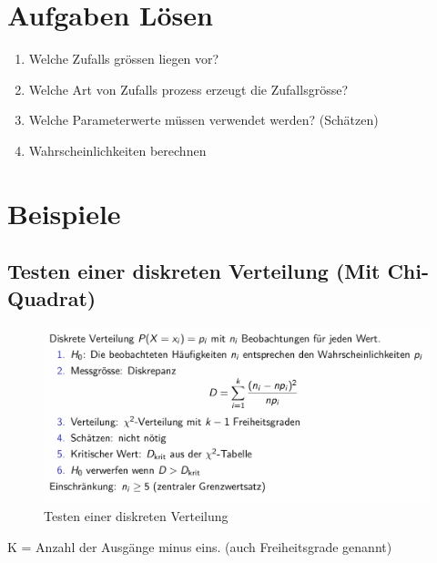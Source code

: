 \documentclass[../Main.tex]{subfiles}
\begin{document}

\section{Aufgaben Lösen}
\begin{enumerate}
    \item Welche Zufalls grössen liegen vor?
    \item Welche Art von Zufalls prozess erzeugt die Zufallsgrösse?
    \item Welche Parameterwerte müssen verwendet werden? (Schätzen)
    \item Wahrscheinlichkeiten berechnen
\end{enumerate}

\section{Beispiele}
\subsection{Testen einer diskreten Verteilung (Mit Chi-Quadrat)}

\begin{figure}[H]
    \centering
    \includegraphics[width=1\linewidth]{Images/test-diskrete-verteilung.png}
    \caption{Testen einer diskreten Verteilung}
\end{figure}
K = Anzahl der Ausgänge minus eins. (auch Freiheitsgrade genannt)
\end{document}

